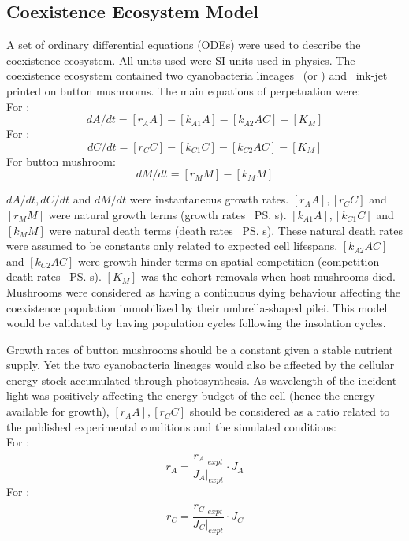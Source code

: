 \documentclass[../thesis.tex]{subfiles} %
\begin{document}
\subsection{Coexistence Ecosystem Model}
A set of ordinary differential equations (ODEs) were used to describe the coexistence ecosystem.  All units used were SI units used in physics.  The coexistence ecosystem contained two cyanobacteria lineages \As\ (or \Ss) and \Cs\ ink-jet printed on button mushrooms.\autocite{joshi2018bacterial}  The main equations of perpetuation were:\\
For \As:
\begin{equation}
	dA/dt = [r_A A] - [k_{A1} A] - [k_{A2} A C] - [K_M]
\end{equation}
For \Cs:
\begin{equation}
	dC/dt = [r_C C] - [k_{C1} C] - [k_{C2} A C] - [K_M]
\end{equation}
For button mushroom:
\begin{equation}
	dM/dt = [r_M M] - [k_M M]
\end{equation}

$dA/dt, dC/dt$ and $dM/dt$ were instantaneous growth rates.  $[r_A A], [r_C C]$ and $[r_M M]$ were natural growth terms (growth rates \times\ \ps s).  $[k_{A1} A], [k_{C1} C]$ and $[k_M M]$ were natural death terms (death rates \times\ \ps s).  These natural death rates were assumed to be constants only related to expected cell lifespans.  $[k_{A2} A C]$ and $[k_{C2} A C]$ were growth hinder terms on spatial competition (competition death rates \times\ \ps s).  $[K_M]$ was the cohort removals when host mushrooms died.  Mushrooms were considered as having a continuous dying behaviour affecting the coexistence population immobilized by their umbrella-shaped pilei.  This model would be validated by having population cycles following the insolation cycles.

Growth rates of button mushrooms should be a constant given a stable nutrient supply.  Yet the two cyanobacteria lineages would also be affected by the cellular energy stock accumulated through photosynthesis.  As wavelength of the incident light was positively affecting the energy budget of the cell (hence the energy available for growth), $[r_A A], [r_C C]$ should be considered as a ratio related to the published experimental conditions and the simulated conditions:\\
For \As:
\begin{equation}
    r_A = \dfrac{r_A|_{expt}}{J_A|_{expt}}\cdot J_{A}
\end{equation}
For \Cs:
\begin{equation}
    r_C = \dfrac{r_C|_{expt}}{J_C|_{expt}}\cdot J_{C}
\end{equation}
\end{document}
